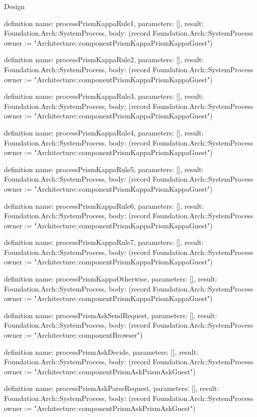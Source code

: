 \begin{lexlean}{Design}
\begin{semanticmodule}
definition{
  name: processPrismKappaRule1,
  parameters: [],
  result: Foundation.Arch::SystemProcess,
  body: (record Foundation.Arch::SystemProcess {owner := "Architecture::componentPrismKappaPrismKappaGuest"})
}

definition{
  name: processPrismKappaRule2,
  parameters: [],
  result: Foundation.Arch::SystemProcess,
  body: (record Foundation.Arch::SystemProcess {owner := "Architecture::componentPrismKappaPrismKappaGuest"})
}

definition{
  name: processPrismKappaRule3,
  parameters: [],
  result: Foundation.Arch::SystemProcess,
  body: (record Foundation.Arch::SystemProcess {owner := "Architecture::componentPrismKappaPrismKappaGuest"})
}

definition{
  name: processPrismKappaRule4,
  parameters: [],
  result: Foundation.Arch::SystemProcess,
  body: (record Foundation.Arch::SystemProcess {owner := "Architecture::componentPrismKappaPrismKappaGuest"})
}

definition{
  name: processPrismKappaRule5,
  parameters: [],
  result: Foundation.Arch::SystemProcess,
  body: (record Foundation.Arch::SystemProcess {owner := "Architecture::componentPrismKappaPrismKappaGuest"})
}

definition{
  name: processPrismKappaRule6,
  parameters: [],
  result: Foundation.Arch::SystemProcess,
  body: (record Foundation.Arch::SystemProcess {owner := "Architecture::componentPrismKappaPrismKappaGuest"})
}

definition{
  name: processPrismKappaRule7,
  parameters: [],
  result: Foundation.Arch::SystemProcess,
  body: (record Foundation.Arch::SystemProcess {owner := "Architecture::componentPrismKappaPrismKappaGuest"})
}

definition{
  name: processPrismKappaOtherwise,
  parameters: [],
  result: Foundation.Arch::SystemProcess,
  body: (record Foundation.Arch::SystemProcess {owner := "Architecture::componentPrismKappaPrismKappaGuest"})
}

definition{
  name: processPrismAskSendRequest,
  parameters: [],
  result: Foundation.Arch::SystemProcess,
  body: (record Foundation.Arch::SystemProcess {owner := "Architecture::componentBrowser"})
}

definition{
  name: processPrismAskDecide,
  parameters: [],
  result: Foundation.Arch::SystemProcess,
  body: (record Foundation.Arch::SystemProcess {owner := "Architecture::componentPrismAskPrismAskGuest"})
}

definition{
  name: processPrismAskParseRequest,
  parameters: [],
  result: Foundation.Arch::SystemProcess,
  body: (record Foundation.Arch::SystemProcess {owner := "Architecture::componentPrismAskPrismAskGuest"})
}


\end{semanticmodule}
\end{lexlean}
